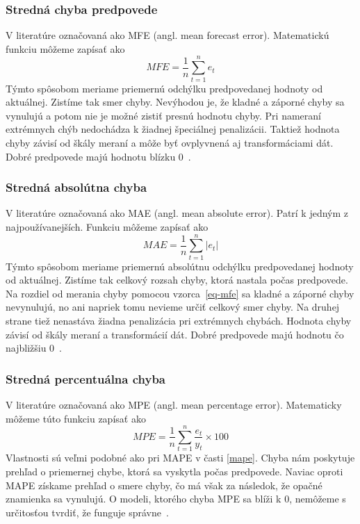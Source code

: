 \documentclass[a4paper,slovak,12pt,appendix]{article}
\begin{document}
\subsubsection{Stredná chyba predpovede}
V literatúre označovaná ako MFE (angl. mean forecast error). Matematickú funkciu
môžeme zapísať ako
\begin{equation}
  MFE = \frac{1}{n} \sum_{t=1}^{n} e_t
  \label{eq-mfe}
\end{equation}
Týmto spôsobom meriame priemernú odchýlku predpovedanej hodnoty od aktuálnej.
Zistíme tak smer chyby. Nevýhodou je, že kladné a záporné chyby sa vynulujú
a potom nie je možné zistiť presnú hodnotu chyby. Pri nameraní extrémnych chýb
nedochádza k žiadnej špeciálnej penalizácii. Taktiež hodnota chyby závisí od škály
meraní a môže byť ovplyvnená aj transformáciami dát. Dobré predpovede majú
hodnotu blízku 0~\cite{Agrawal2013}.

\subsubsection{Stredná absolútna chyba}
V literatúre označovaná ako MAE (angl. mean absolute error). Patrí k jedným
z najpoužívanejších. Funkciu môžeme zapísať ako
\begin{equation}
  MAE = \frac{1}{n} \sum_{t=1}^{n} |e_t|
  \label{eq-mae}
\end{equation}
Týmto spôsobom meriame priemernú absolútnu odchýlku predpovedanej hodnoty od
aktuálnej. Zistíme tak celkový rozsah chyby, ktorá nastala počas predpovede.
Na rozdiel od merania chyby pomocou vzorca~\ref{eq-mfe} sa kladné a záporné
chyby nevynulujú, no ani napriek tomu nevieme určiť celkový smer chyby.
Na druhej strane tiež nenastáva žiadna penalizácia pri extrémnych chybách.
Hodnota chyby závisí od škály meraní a transformácií dát. Dobré predpovede majú
hodnotu čo najbližšiu 0~\cite{Agrawal2013, Gutierrez2015}.

\subsubsection{Stredná percentuálna chyba}
V literatúre označovaná ako MPE (angl. mean percentage error). Matematicky môžeme
túto funkciu zapísať ako
\begin{equation}
  MPE = \frac{1}{n} \sum_{t=1}^{n} \frac{e_t}{y_t} \times 100
  \label{eq-mpe}
\end{equation}
Vlastnosti sú veľmi podobné ako pri MAPE v časti \ref{mape}. Chyba nám
poskytuje prehľad o priemernej chybe, ktorá sa vyskytla počas predpovede.
Naviac oproti MAPE získame prehľad o smere chyby, čo má však za následok, že
opačné znamienka sa vynulujú. O modeli, ktorého chyba MPE sa blíži k 0,
nemôžeme s určitosťou tvrdiť, že funguje správne~\cite{Agrawal2013}.
\end{document}
